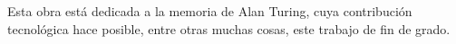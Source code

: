 \begin{dedicatoria}
Esta obra está dedicada a la memoria de Alan Turing, cuya contribución tecnológica hace posible, entre otras muchas cosas, este trabajo de fin de grado.
\end{dedicatoria}